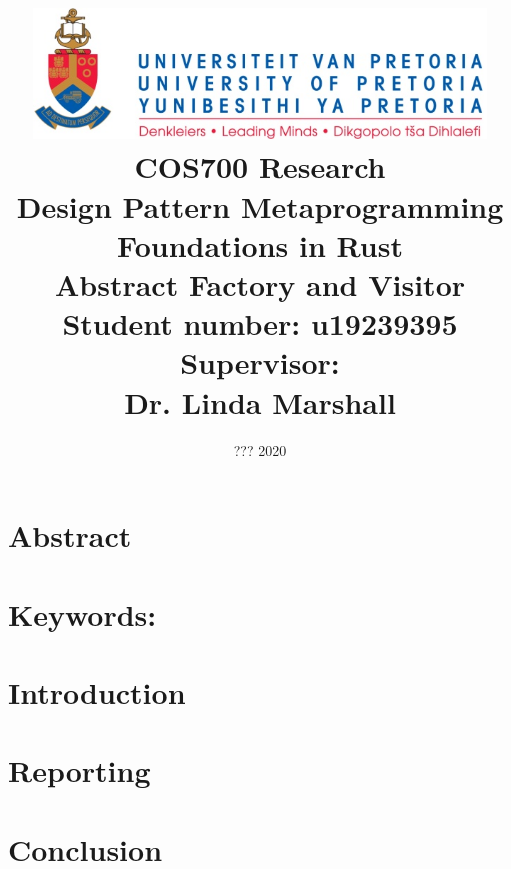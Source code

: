 \documentclass[a4paper,10pt]{article}
\title
{
   \includegraphics[width=12cm]{up_logo.png} \\
   \vspace{2cm}
   \textbf{COS700 Research} \\ \vspace{0.5cm}
   \textbf{Design Pattern Metaprogramming Foundations in Rust\\ \large Abstract Factory and Visitor} \\ \vspace{0.5cm}
   \textbf{Student number:} u19239395 \\ \vspace{0.5cm}
   \textbf{Supervisor}: \\ Dr. Linda Marshall
}
\date{??? 2020}
\begin{document}
\author{}

\maketitle

\newpage
\linespread{1.25}

\section*{Abstract}

\section*{Keywords:}

\newpage

\section{Introduction}





\section{Reporting}

\section{Conclusion}




\end{document}
